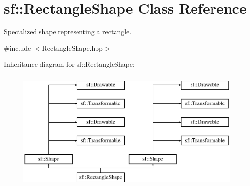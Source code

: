 \hypertarget{classsf_1_1_rectangle_shape}{\section{sf\-:\-:Rectangle\-Shape Class Reference}
\label{classsf_1_1_rectangle_shape}
}


Specialized shape representing a rectangle.  




{\ttfamily \#include $<$Rectangle\-Shape.\-hpp$>$}

Inheritance diagram for sf\-:\-:Rectangle\-Shape\-:\begin{figure}[H]
\begin{center}
\leavevmode
\includegraphics[height=6.000000cm]{classsf_1_1_rectangle_shape}
\end{center}
\end{figure}
